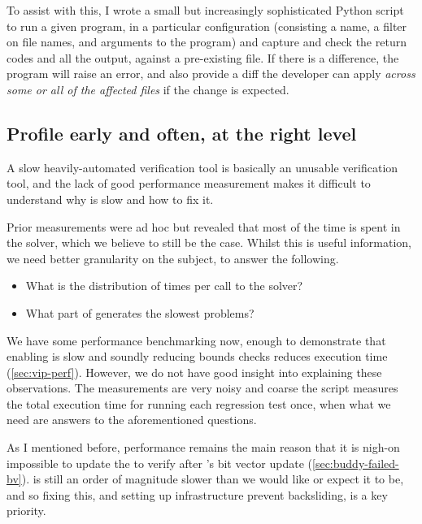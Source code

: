 To assist with this, I wrote a small but increasingly sophisticated Python
script to run a given program, in a particular configuration (consisting a
name, a filter on file names, and arguments to the program) and capture and
check the return codes and all the output, against a pre-existing file. If
there is a difference, the program will raise an error, and also provide a diff
the developer can apply \emph{across some or all of the affected files} if the
change is expected.

\subsection{Profile early and often, at the right level}\label{subsec:profile}

A slow heavily-automated verification tool is basically an unusable
verification tool, and the lack of good performance measurement makes it
difficult to understand why  is slow and how to fix it.

Prior measurements were ad hoc but revealed that most of the time is spent in
the solver, which we believe to still be the case. Whilst this is useful
information, we need better granularity on the subject, to answer the following.
\begin{itemize}
    \item What is the distribution of times per call to the solver?
    \item What part of  generates the slowest problems?
\end{itemize}

We have some performance benchmarking now, enough to demonstrate that enabling
 is slow and soundly reducing bounds checks reduces execution time (\cref{sec:vip-perf}). However, we
do not have good insight into explaining these observations. The measurements
are very noisy and coarse \textemdash{} the script measures the total execution
time for running each regression test once, when what we need are answers to
the aforementioned questions.

As I mentioned before, performance remains the main reason that it is nigh-on
impossible to update the  to verify after 's
bit vector update (\cref{sec:buddy-failed-bv}).  is still an order of
magnitude slower than we would like or expect it to be, and so fixing this, and
setting up infrastructure prevent backsliding, is a key priority.

